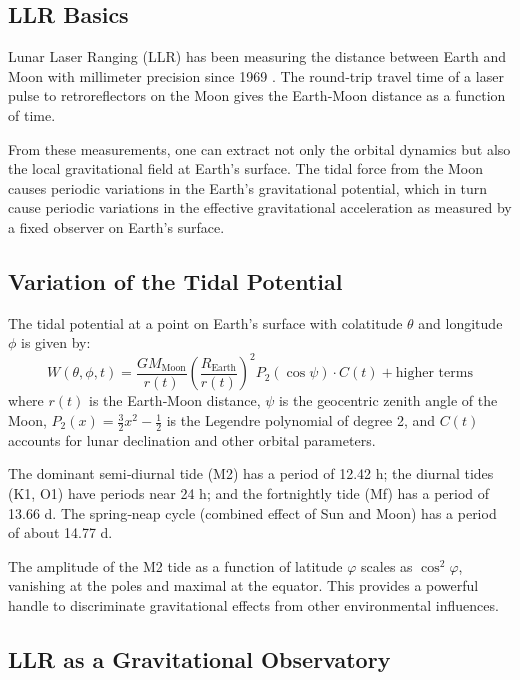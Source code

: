 \documentclass[12pt,a4paper]{article}
\theoremstyle{remark}
\begin{document}
	\subsection{LLR Basics}
	
	Lunar Laser Ranging (LLR) has been measuring the distance between Earth and Moon with millimeter precision since 1969 \cite{LLR-IfE}. The round‑trip travel time of a laser pulse to retroreflectors on the Moon gives the Earth‑Moon distance as a function of time.
	
	From these measurements, one can extract not only the orbital dynamics but also the local gravitational field at Earth's surface. The tidal force from the Moon causes periodic variations in the Earth's gravitational potential, which in turn cause periodic variations in the effective gravitational acceleration as measured by a fixed observer on Earth's surface.
	
	\subsection{Variation of the Tidal Potential}
	
	The tidal potential at a point on Earth's surface with colatitude \(\theta\) and longitude \(\phi\) is given by:
	\begin{equation}
		W(\theta,\phi,t) = \frac{GM_{\text{Moon}}}{r(t)} \left(\frac{R_{\text{Earth}}}{r(t)}\right)^2 P_2(\cos\psi) \cdot C(t) + \text{higher terms}
		\label{eq:tidal-full}
	\end{equation}
	where \(r(t)\) is the Earth‑Moon distance, \(\psi\) is the geocentric zenith angle of the Moon, \(P_2(x)=\frac{3}{2}x^2-\frac12\) is the Legendre polynomial of degree 2, and \(C(t)\) accounts for lunar declination and other orbital parameters.
	
	The dominant semi‑diurnal tide (M2) has a period of 12.42 h; the diurnal tides (K1, O1) have periods near 24 h; and the fortnightly tide (Mf) has a period of 13.66 d. The spring‑neap cycle (combined effect of Sun and Moon) has a period of about 14.77 d.
	
	The amplitude of the M2 tide as a function of latitude \(\varphi\) scales as \(\cos^2\varphi\), vanishing at the poles and maximal at the equator. This provides a powerful handle to discriminate gravitational effects from other environmental influences.
	
	\subsection{LLR as a Gravitational Observatory}
	
\end{document}

